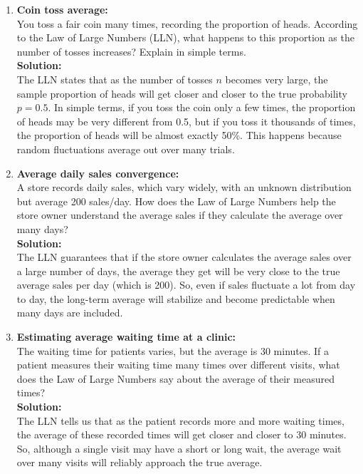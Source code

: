 \documentclass{book}
\begin{document}
\begin{enumerate}

    \item \textbf{Coin toss average:} \\
    You toss a fair coin many times, recording the proportion of heads. According to the Law of Large Numbers (LLN), what happens to this proportion as the number of tosses increases? Explain in simple terms. \\
    
    \textbf{Solution:} \\
    The LLN states that as the number of tosses \(n\) becomes very large, the sample proportion of heads will get closer and closer to the true probability \(p = 0.5\). In simple terms, if you toss the coin only a few times, the proportion of heads may be very different from 0.5, but if you toss it thousands of times, the proportion of heads will be almost exactly 50\%. This happens because random fluctuations average out over many trials.

    \item \textbf{Average daily sales convergence:} \\
    A store records daily sales, which vary widely, with an unknown distribution but average 200 sales/day. How does the Law of Large Numbers help the store owner understand the average sales if they calculate the average over many days? \\
    
    \textbf{Solution:} \\
    The LLN guarantees that if the store owner calculates the average sales over a large number of days, the average they get will be very close to the true average sales per day (which is 200). So, even if sales fluctuate a lot from day to day, the long-term average will stabilize and become predictable when many days are included.

    \item \textbf{Estimating average waiting time at a clinic:} \\
    The waiting time for patients varies, but the average is 30 minutes. If a patient measures their waiting time many times over different visits, what does the Law of Large Numbers say about the average of their measured times? \\
    
    \textbf{Solution:} \\
    The LLN tells us that as the patient records more and more waiting times, the average of these recorded times will get closer and closer to 30 minutes. So, although a single visit may have a short or long wait, the average wait over many visits will reliably approach the true average.

\end{enumerate}
\end{document}
